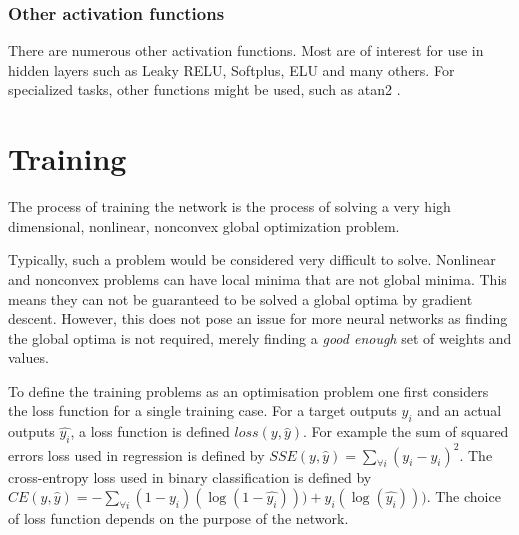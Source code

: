 \documentclass[12pt,parskip]{komatufte}
\begin{document}
\subsubsection{Other activation functions}

There are numerous other activation functions.
Most are of interest for use in hidden layers such as Leaky RELU, Softplus, ELU and many others.
For specialized tasks, other functions might be used, such as atan2 .




\section{Training}
The process of training the network is the process of solving a very high dimensional, nonlinear, nonconvex global optimization problem.


Typically, such a problem would be considered very difficult to solve.
Nonlinear and nonconvex problems can have local minima that are not global minima.
This means they can not be guaranteed to be solved  a global optima by gradient descent.
However, this does not pose an issue for more neural networks as finding the global optima is not required, merely finding a \emph{good enough} set of weights and values.

To define the training problems as an optimisation problem one first considers the loss function for a single training case.
For a target outputs $y_i$ and an actual outputs $\hat{y_i}$, a loss function is defined $loss(y, \hat{y})$.
For example the sum of squared errors loss used in regression is defined by 
$SSE(y, \hat{y})=\sum_{\forall i} (y_i-\hat{y_i})^2$.
The cross-entropy loss used in binary classification is defined by
$CE(y, \hat{y})=-\sum_{\forall i} (1-y_i)(\log (1-\hat{y_i}))) + y_i(\log (\hat{y_i})))$.
The choice of loss function depends on the purpose of the network.
\end{document}
